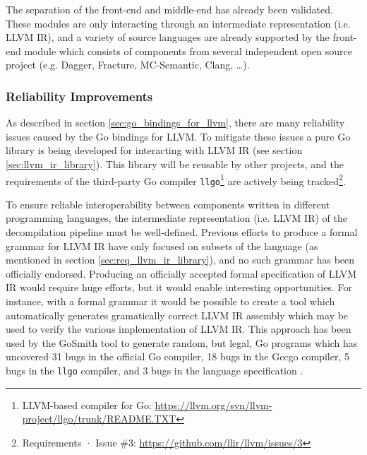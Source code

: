 The separation of the front-end and middle-end has already been validated. These modules are only interacting through an intermediate representation (i.e. LLVM IR), and a variety of source languages are already supported by the front-end module which consists of components from several independent open source project (e.g. Dagger, Fracture, MC-Semantic, Clang, …).


\subsubsection{Reliability Improvements}

As described in section \ref{sec:go_bindings_for_llvm}, there are many reliability issues caused by the Go bindings for LLVM. To mitigate these issues a pure Go library is being developed for interacting with LLVM IR (see section \ref{sec:llvm_ir_library}). This library will be reusable by other projects, and the requirements of the third-party Go compiler \texttt{llgo}\footnote{LLVM-based compiler for Go: \url{https://llvm.org/svn/llvm-project/llgo/trunk/README.TXT}} are actively being tracked\footnote{Requirements · Issue \#3: \url{https://github.com/llir/llvm/issues/3}}.

To ensure reliable interoperability between components written in different programming languages, the intermediate representation (i.e. LLVM IR) of the decompilation pipeline must be well-defined. Previous efforts to produce a formal grammar for LLVM IR have only focused on subsets of the language (as mentioned in section \ref{sec:req_llvm_ir_library}), and no such grammar has been officially endorsed. Producing an officially accepted formal specification of LLVM IR would require huge efforts, but it would enable interesting opportunities. For instance, with a formal grammar it would be possible to create a tool which automatically generates gramatically correct LLVM IR assembly which may be used to verify the various implementation of LLVM IR. This approach has been used by the GoSmith tool to generate random, but legal, Go programs which has uncovered 31 bugs in the official Go compiler, 18 bugs in the Gccgo compiler, 5 bugs in the \texttt{llgo} compiler, and 3 bugs in the language specification \cite{gosmith}.


